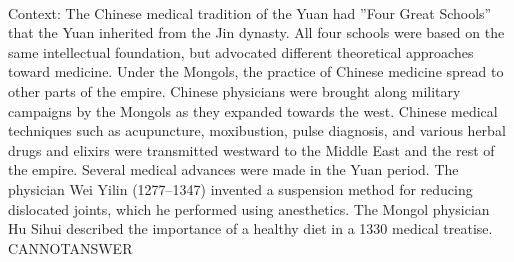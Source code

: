 \documentclass[11pt,a4paper, onecolumn]{article}
\begin{document}
\\ Context: The Chinese medical tradition of the Yuan had ''Four Great Schools'' that the Yuan inherited from the Jin dynasty. All four schools were based on the same intellectual foundation, but advocated different theoretical approaches toward medicine. Under the Mongols, the practice of Chinese medicine spread to other parts of the empire. Chinese physicians were brought along military campaigns by the Mongols as they expanded towards the west. Chinese medical techniques such as acupuncture, moxibustion, pulse diagnosis, and various herbal drugs and elixirs were transmitted westward to the Middle East and the rest of the empire. Several medical advances were made in the Yuan period. The physician Wei Yilin (1277–1347) invented a suspension method for reducing dislocated joints, which he performed using anesthetics. The Mongol physician Hu Sihui described the importance of a healthy diet in a 1330 medical treatise. CANNOTANSWER
\end{document}
